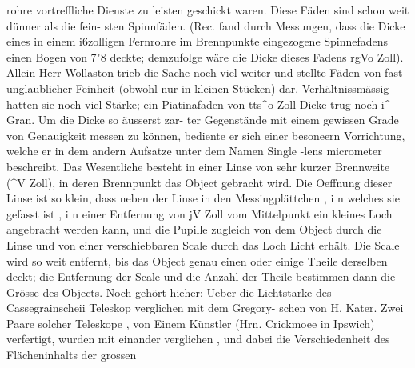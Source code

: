 \documentclass[12pt,a4paper]{article}
\begin{document}
rohre vortreffliche Dienste zu leisten geschickt waren. Diese Fäden sind schon weit dünner als die fein-\newline
sten Spinnfäden. (Rec. fand durch Messungen, dass die Dicke eines in einem i6zolligen Fernrohre im\newline
Brennpunkte eingezogene Spinnefadens einen Bogen von 7"8 deckte; demzufolge wäre die Dicke dieses\newline
Fadens rgVo Zoll). Allein Herr Wollaston trieb die Sache noch viel weiter und stellte Fäden von\newline
fast unglaublicher Feinheit (obwohl nur in kleinen Stücken) dar. Verhältnissmässig hatten sie noch\newline
viel Stärke; ein Piatinafaden von tts\^{}o Zoll Dicke trug noch i\^{} Gran. Um die Dicke so äusserst zar-\newline
ter Gegenstände mit einem gewissen Grade von Genauigkeit messen zu können, bediente er sich einer\newline
besoneern Vorrichtung, welche er in dem andern Aufsatze unter dem Namen Single -lens micrometer\newline
beschreibt. Das Wesentliche besteht in einer Linse von sehr kurzer Brennweite (\^{}V Zoll), in deren\newline
Brennpunkt das Object gebracht wird. Die Oeffnung dieser Linse ist so klein, dass neben der Linse in\newline
den Messingplättchen , i n welches sie gefasst ist , i n einer Entfernung von jV Zoll vom Mittelpunkt ein\newline
kleines Loch angebracht werden kann, und die Pupille zugleich von dem Object durch die Linse und\newline
von einer verschiebbaren Scale durch das Loch Licht erhält. Die Scale wird so weit entfernt, bis das\newline
Object genau einen oder einige Theile derselben deckt; die Entfernung der Scale und die Anzahl der\newline
Theile bestimmen dann die Grösse des Objects.\newline
Noch gehört hieher: Ueber die Lichtstarke des Cassegrainscheii Teleskop verglichen mit dem Gregory-\newline
schen von H. Kater. Zwei Paare solcher Teleskope , von Einem Künstler (Hrn. Crickmoee in Ipswich)\newline
verfertigt, wurden mit einander verglichen , und dabei die Verschiedenheit des Flächeninhalts der grossen\newline
\end{document}

